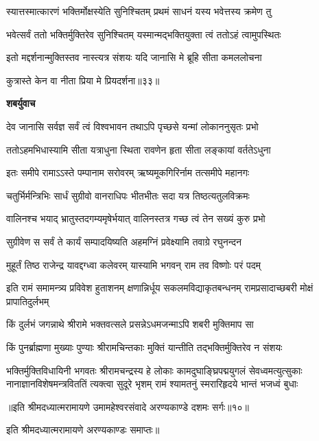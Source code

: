 \twolineshloka
{स्यात्तस्मात्कारणं भक्तिर्मोक्षस्येति सुनिश्चितम्}
{प्रथमं साधनं यस्य भवेत्तस्य क्रमेण तु} %

\twolineshloka
{भवेत्सर्वं ततो भक्तिर्मुक्तिरेव सुनिश्चितम्}
{यस्मान्मद्भक्तियुक्ता त्वं ततोऽहं त्वामुपस्थितः} %

\twolineshloka
{इतो मद्दर्शनान्मुक्तिस्तव नास्त्यत्र संशयः}
{यदि जानासि मे ब्रूहि सीता कमललोचना} %

{कुत्रास्ते केन वा नीता प्रिया मे प्रियदर्शना॥३३॥} %


\textbf{शबर्युवाच}

\twolineshloka
{देव जानासि सर्वज्ञ सर्वं त्वं विश्वभावन}
{तथाऽपि पृच्छसे यन्मां लोकाननुसृतः प्रभो} %

\twolineshloka
{ततोऽहमभिधास्यामि सीता यत्राधुना स्थिता}
{रावणेन हृता सीता लङ्कायां वर्ततेऽधुना} %

\twolineshloka
{इतः समीपे रामाऽऽस्ते पम्पानाम सरोवरम्}
{ऋष्यमूकगिरिर्नाम तत्समीपे महानगः} %

\twolineshloka
{चतुर्भिर्मन्त्रिभिः सार्धं सुग्रीवो वानराधिपः}
{भीतभीतः सदा यत्र तिष्ठत्यतुलविक्रमः} %

\twolineshloka
{वालिनश्च भयाद् भ्रातुस्तदगम्यमृषेर्भयात्}
{वालिनस्तत्र गच्छ त्वं तेन सख्यं कुरु प्रभो} %

\twolineshloka
{सुग्रीवेण स सर्वं ते कार्यं सम्पादयिष्यति}
{अहमग्निं प्रवेक्ष्यामि तवाग्रे रघुनन्दन} %

\twolineshloka
{मुहूर्तं तिष्ठ राजेन्द्र यावद्दग्ध्वा कलेवरम्}
{यास्यामि भगवन् राम तव विष्णोः परं पदम्} %

\threelineshloka
{इति रामं समामन्त्र्य प्रविवेश हुताशनम्}
{क्षणान्निर्धूय सकलमविद्याकृतबन्धनम्}
{रामप्रसादाच्छबरी मोक्षं प्रापातिदुर्लभम्} %

\twolineshloka
{किं दुर्लभं जगन्नाथे श्रीरामे भक्तवत्सले}
{प्रसन्नेऽधमजन्माऽपि शबरी मुक्तिमाप सा} %

\twolineshloka
{किं पुनर्ब्राह्मणा मुख्याः पुण्याः श्रीरामचिन्तकाः}
{मुक्तिं यान्तीति तद्भक्तिर्मुक्तिरेव न संशयः} %

\fourlineindentedshloka
{भक्तिर्मुक्तिविधायिनी भगवतः श्रीरामचन्द्रस्य हे}
{लोकाः कामदुघाङ्घ्रिपद्मयुगलं सेवध्वमत्युत्सुकाः}
{नानाज्ञानविशेषमन्त्रविततिं त्यक्त्वा सुदूरे भृशम्}
{रामं श्यामतनुं स्मरारिहृदये भान्तं भजध्वं बुधाः} %

{॥इति श्रीमदध्यात्मरामायणे उमामहेश्वरसंवादे
अरण्यकाण्डे दशमः सर्गः॥१०॥
}

इति श्रीमदध्यात्मरामायणे अरण्यकाण्डः समाप्तः॥
